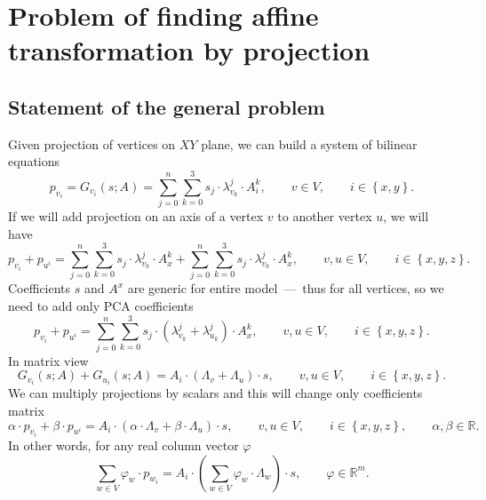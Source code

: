 \section{Problem of finding affine transformation by projection}

\subsection{Statement of the general problem}

Given projection of vertices on $XY$ plane,
we can build a system of bilinear equations
\begin{equation*}
  p_{v_i}
  = G_{v_i}\left( s; A \right)
  = \sum\limits_{j = 0}^{n} \sum\limits_{k = 0}^{3}
    s_{j} \cdot \lambda^{j}_{v_k} \cdot A_i^{k},
  \qquad v \in V,
  \qquad i \in \left\{ x, y \right\}.
\end{equation*}
If we will add projection on an axis
of a vertex $v$ to another vertex $u$,
we  will have
\begin{equation*}
  p_{v_i} + p_{u^i}
  = \sum\limits_{j = 0}^{n} \sum\limits_{k = 0}^{3}
    s_{j} \cdot \lambda^{j}_{v_k} \cdot A_x^{k}
  + \sum\limits_{j = 0}^{n} \sum\limits_{k = 0}^{3}
    s_{j} \cdot \lambda^{j}_{v_k} \cdot A_x^{k},
  \qquad v, u \in V,
  \qquad i \in \left\{ x, y, z \right\}.
\end{equation*}
Coefficients $s$ and $A^x$ are generic
for entire model~---~thus for all vertices,
so we need to add only PCA coefficients
\begin{equation*}
  p_{v_i} + p_{u^i}
  = \sum\limits_{j = 0}^{n} \sum\limits_{k = 0}^{3}
    s_{j} \cdot \left( \lambda^{j}_{v_k} + \lambda^{j}_{u_k} \right)
    \cdot A_x^{k},
  \qquad v, u \in V,
  \qquad i \in \left\{ x, y, z \right\}.
\end{equation*}
In matrix view
\begin{equation*}
  G_{v_i}\left( s; A \right) + G_{u_i}\left( s; A \right)
  = A_i \cdot \left( \Lambda_v + \Lambda_u \right) \cdot s,
  \qquad v, u \in V,
  \qquad i \in \left\{ x, y, z \right\}.
\end{equation*}
We can multiply projections by scalars
and this will change only coefficients matrix
\begin{equation*}
  \alpha \cdot p_{v_i} + \beta \cdot p_{u^i}
  = A_i
    \cdot \left( \alpha \cdot \Lambda_v + \beta \cdot \Lambda_u \right)
    \cdot s,
  \qquad v, u \in V,
  \qquad i \in \left\{ x, y, z \right\},
  \qquad \alpha, \beta \in \mathbb{R}.
\end{equation*}
In other words, for any real column vector $\varphi$
\begin{equation*}
  \sum_{w \in V} \varphi_w \cdot p_{w_i}
  = A_i
    \cdot \left( \sum_{w \in V} \varphi_w \cdot \Lambda_w \right)
    \cdot s,
  \qquad \varphi \in \mathbb{R}^m.
\end{equation*}

